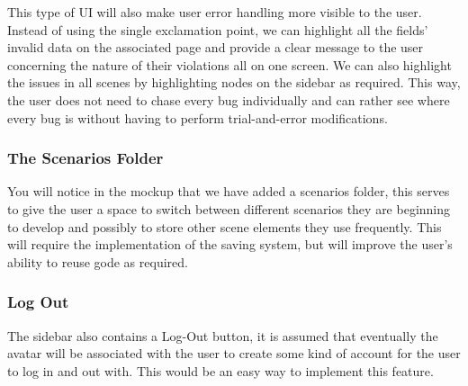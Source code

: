\documentclass[sigart]{acmart_mod} %
\begin{document}
This type of UI will also make user error handling more visible to the user. Instead of using the single exclamation point, we can highlight all the fields' invalid data on the associated page and provide a clear message to the user concerning the nature of their violations all on one screen. We can also highlight the issues in all scenes by highlighting nodes on the sidebar as required. This way, the user does not need to chase every bug individually and can rather see where every bug is without having to perform trial-and-error modifications.

\subsubsection{The Scenarios Folder}
You will notice in the mockup that we have added a scenarios folder, this serves to give the user a space to switch between different scenarios they are beginning to develop and possibly to store other scene elements they use frequently. This will require the implementation of the saving system, but will improve the user's ability to reuse gode as required.

\subsubsection{Log Out}
The sidebar also contains a Log-Out button, it is assumed that eventually the avatar will be associated with the user to create some kind of account for the user to log in and out with. This would be an easy way to implement this feature.
\end{document}

